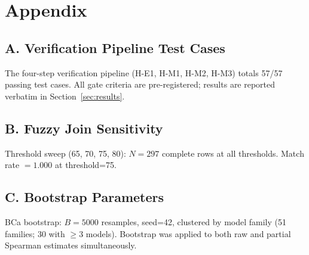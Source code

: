 \section*{Appendix}
\label{sec:appendix}

\subsection*{A. Verification Pipeline Test Cases}

The four-step verification pipeline (H-E1, H-M1, H-M2, H-M3) totals 57/57 passing test cases. All gate criteria are pre-registered; results are reported verbatim in Section~\ref{sec:results}.

\subsection*{B. Fuzzy Join Sensitivity}

Threshold sweep (65, 70, 75, 80): $N{=}297$ complete rows at all thresholds. Match rate $= 1.000$ at threshold=75.

\subsection*{C. Bootstrap Parameters}

BCa bootstrap: $B{=}5000$ resamples, seed=42, clustered by model family (51 families; 30 with $\geq 3$ models). Bootstrap was applied to both raw and partial Spearman estimates simultaneously.
